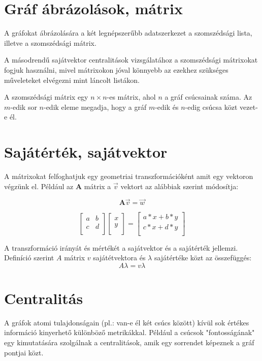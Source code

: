 \documentclass[12pt,numbers=noenddot]{report}
\begin{document}
\section{Gráf ábrázolások, mátrix}
A gráfokat ábrázolására a két legnépszerűbb adatszerkezet a szomszédsági lista, 
illetve a szomszédsági mátrix.

A másodrendű sajátvektor centralitások vizsgálatához a szomszédsági mátrixokat 
fogjuk használni, mivel mátrixokon jóval könnyebb az ezekhez szükséges 
műveleteket elvégezni mint láncolt listákon.

A szomszédsági mátrix egy $n \times n$-es mátrix, ahol $n$ a gráf csúcsainak 
száma. Az $m$-edik sor $n$-edik eleme megadja, hogy a gráf $m$-edik és 
$n$-edig csúcsa közt vezet-e él.


\pagebreak

\section{Sajátérték, sajátvektor}
A mátrixokat felfoghatjuk egy geometriai transzformációként amit egy vektoron 
végzünk el. Például az $\textbf{A}$ mátrix a $\vec{v}$ vektort az alábbiak 
szerint módosítja:

$$
\textbf{A} \vec{v} = \vec{w}
$$

$$
{
	\begin{bmatrix}
		a & b \\
		c & d \\
	\end{bmatrix}
}
{
	\begin{bmatrix}
		x \\
		y \\
	\end{bmatrix}
}
=
{
	\begin{bmatrix}
		a*x+b*y \\
		c*x+d*y \\
	\end{bmatrix}
}
$$

\vspace{1cm}

A transzformáció irányát és mértékét a sajátvektor és a sajátérték jellemzi.
Definíció szerint $A$ mátrix $v$ sajátétvektora és $\lambda$ sajátértéke 
közt az összefüggés: $$A \lambda = v \lambda$$


\section{Centralitás}
A gráfok atomi tulajdonságain (pl.: van-e él két csúcs között) kívül sok 
értékes információ kinyerhető különböző metrikákkal. Például a csúcsok 
"fontosságának" egy kimutatására szolgálnak a centralitások, amik egy sorrendet 
képeznek a gráf pontjai közt. 
\end{document}
